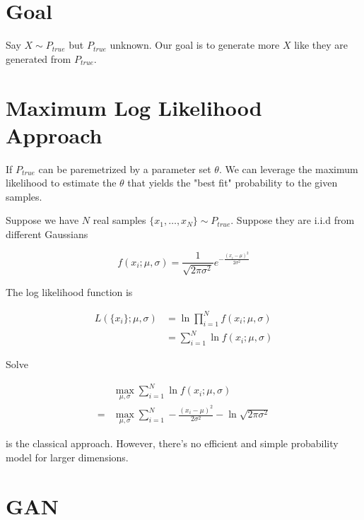 \documentclass{article}
\begin{document}
    \section*{Goal}

        Say $ X \sim P_{true} $ but $ P_{true} $ unknown. Our goal is to
        generate more $ X $ like they are generated from $ P_{true} $.

    \section*{Maximum Log Likelihood Approach}

        If $ P_{true} $ can be paremetrized by a parameter set $ \theta $.
        We can leverage the maximum likelihood to estimate the $ \theta $ that
        yields the "best fit" probability to the given samples.

        Suppose we have $ N $ real samples $ \{ x_{1}, \dots, x_{N} \} \sim P_{true} $.
        Suppose they are i.i.d from different Gaussians

        \begin{equation*}
            f( x_{i}; \mu, \sigma ) = \frac{1}{\sqrt{2 \pi \sigma^2}} e^{-\frac{(x_{i} - \mu)^2}{2 \sigma^2}}
        \end{equation*}

        The log likelihood function is

        \begin{align*}
             L( \{ x_{i} \}; \mu, \sigma ) &= \ln \prod_{i=1}^N f( x_{i}; \mu, \sigma ) \\
                             &= \sum_{i = 1}^N \ln f( x_{i}; \mu, \sigma )
        \end{align*}

        Solve

        \begin{align*}
              & \max_{\mu, \sigma} \sum_{i = 1}^N \ln f( x_{i}; \mu, \sigma ) \\
            = & \max_{\mu, \sigma} \sum_{i = 1}^N -\frac{( x_{i} - \mu ) ^ 2}{2
            \sigma^2} - \ln \sqrt{2 \pi \sigma^2 }
        \end{align*}

        is the classical approach. However, there's no efficient
        and simple probability model for larger dimensions.

    \section*{GAN}
\end{document}
